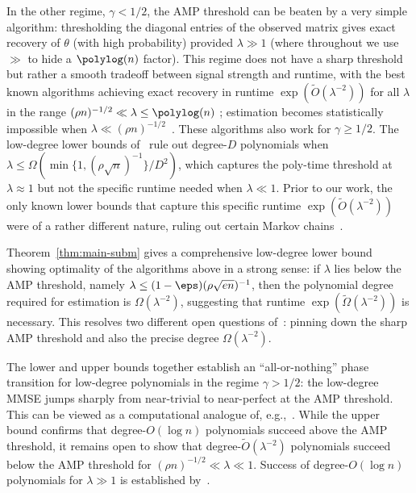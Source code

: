 \documentclass[11pt]{article}
\begin{document}
In the other regime, $\gamma < 1/2$, the AMP threshold can be beaten by a very simple algorithm: thresholding the diagonal entries of the observed matrix gives exact recovery of $\theta$ (with high probability) provided $\lambda \gg 1$ (where throughout we use $\gg$ to hide a $\polylog(n)$ factor). This regime does not have a sharp threshold but rather a smooth tradeoff between signal strength and runtime, with the best known algorithms achieving exact recovery in runtime $\exp(\tilde{O}(\lambda^{-2}))$ for all $\lambda$ in the range $(\rho n)^{-1/2} \ll \lambda \le \polylog(n)$ \cite{subexp-sparse,anytime-sparse}; estimation becomes statistically impossible when $\lambda \ll (\rho n)^{-1/2}$~\cite{kolar-info,BIS-info}. These algorithms also work for $\gamma \ge 1/2$. The low-degree lower bounds of~\cite{SW-estimation} rule out degree-$D$ polynomials when $\lambda \le \Omega(\min\{1,(\rho\sqrt{n})^{-1}\}/D^2)$, which captures the poly-time threshold at $\lambda \approx 1$ but not the specific runtime needed when $\lambda \ll 1$. Prior to our work, the only known lower bounds that capture this specific runtime $\exp(\tilde{O}(\lambda^{-2}))$ were of a rather different nature, ruling out certain Markov chains~\cite{ogp-sparse}.

Theorem~\ref{thm:main-subm} gives a comprehensive low-degree lower bound showing optimality of the algorithms above in a strong sense: if $\lambda$ lies below the AMP threshold, namely $\lambda \le (1-\eps) (\rho\sqrt{en})^{-1}$, then the polynomial degree required for estimation is $\Omega(\lambda^{-2})$, suggesting that runtime $\exp(\tilde\Omega(\lambda^{-2}))$ is necessary. This resolves two different open questions of~\cite{SW-estimation}: pinning down the sharp AMP threshold and also the precise degree $\Omega(\lambda^{-2})$.

The lower and upper bounds together establish an ``all-or-nothing'' phase transition for low-degree polynomials in the regime $\gamma > 1/2$: the low-degree MMSE jumps sharply from near-trivial to near-perfect at the AMP threshold. This can be viewed as a computational analogue of, e.g.,~\cite{all-nothing}. While the upper bound confirms that degree-$O(\log n)$ polynomials succeed above the AMP threshold, it remains open to show that degree-$\tilde{O}(\lambda^{-2})$ polynomials succeed below the AMP threshold for $(\rho n)^{-1/2} \ll \lambda \ll 1$. Success of degree-$O(\log n)$ polynomials for $\lambda \gg 1$ is established by~\cite{SW-estimation}.
\end{document}
